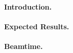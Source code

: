 \documentclass[12pt, a4paper, oneside]{beamprop}
\begin{document}
	\paragraph{Introduction.}
	\lipsum[1]
	
	\paragraph{Expected Results.}
	\lipsum[1]
	
	\paragraph{Beamtime.}
	\lipsum[1]
\end{document}
